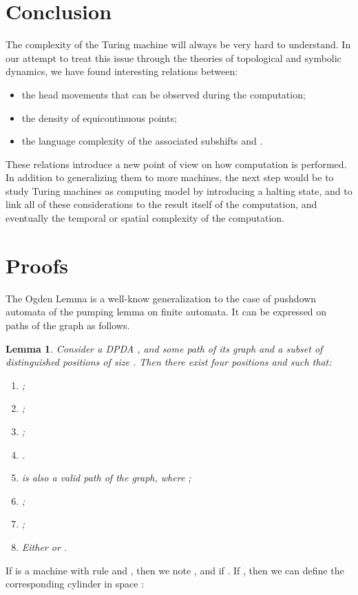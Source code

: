\documentclass{llncs}
\newtheorem{lem}{Lemma}
\begin{document}
\section*{Conclusion}
The complexity of the Turing machine will always be very hard to understand.
In our attempt to treat this issue through the theories of topological and symbolic dynamics, we have found interesting relations between:
\begin{itemize}
 \item the head movements that can be observed during the computation;
 \item the density of equicontinuous points;
 \item the language complexity of the associated subshifts  and .
\end{itemize} 
These relations introduce a new point of view on how computation is performed.
In addition to generalizing them to more machines, the next step would be to study Turing machines as computing model by introducing a halting state, and to link all of these considerations to the result itself of the computation, and eventually the temporal or spatial complexity of the computation.



\newpage

\appendix\section*{Proofs}
The Ogden Lemma \cite{Odge} is a well-know generalization to the case of pushdown automata of the pumping lemma on finite automata. It can be expressed on paths of the graph as follows.
\begin{lem}\label{l:bomba}
 Consider a DPDA , and  some path of its graph and  a subset of distinguished positions of size .
Then there exist four positions  and such that:
\begin{enumerate}
 \item ;
 \item ;
 \item ;
 \item .
 \item  is also a valid path of the graph, where ;
 \item ;
 \item ;
 \item Either  or .
\end{enumerate}
\end{lem}


If  is a machine with rule  and , then we note ,  and  if .
If , then we can define the corresponding cylinder in space :
\end{document}
